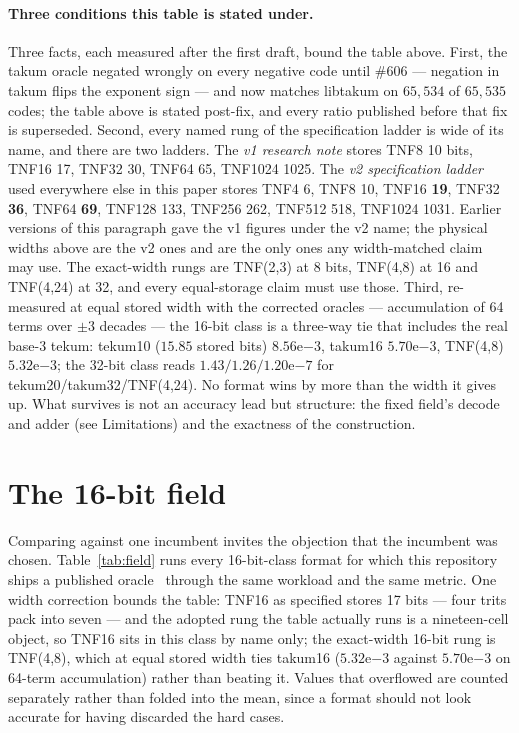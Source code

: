 \paragraph{Three conditions this table is stated under.} Three
facts, each measured after the first draft, bound the table above. First, the
takum oracle negated wrongly on every negative code until \#606 --- negation
in takum flips the exponent sign --- and now matches libtakum on $65{,}534$ of
$65{,}535$ codes; the table above is stated post-fix, and every ratio published
before that fix is superseded. Second, every named rung of the specification
ladder is wide of its name, and there are two ladders. The \emph{v1 research
note} stores TNF8 10 bits, TNF16 17, TNF32 30, TNF64 65, TNF1024 1025. The
\emph{v2 specification ladder} used everywhere else in this paper stores
TNF4 6, TNF8 10, TNF16 \textbf{19}, TNF32 \textbf{36}, TNF64 \textbf{69},
TNF128 133, TNF256 262, TNF512 518, TNF1024 1031. Earlier versions of this
paragraph gave the v1 figures under the v2 name; the physical widths above are
the v2 ones and are the only ones any width-matched claim may use. The
exact-width rungs are TNF(2,3) at 8 bits, TNF(4,8) at 16 and TNF(4,24) at 32,
and every equal-storage claim must use those. Third, re-measured at equal stored width
with the corrected oracles --- accumulation of 64 terms over $\pm3$ decades
--- the 16-bit class is a three-way tie that includes the real base-3 tekum:
tekum10 ($15.85$ stored bits) $8.56\mathrm{e}{-3}$, takum16
$5.70\mathrm{e}{-3}$, TNF(4,8) $5.32\mathrm{e}{-3}$; the 32-bit class reads
$1.43/1.26/1.20\mathrm{e}{-7}$ for tekum20/takum32/TNF(4,24). No format wins
by more than the width it gives up. What survives is not an accuracy lead but
structure: the fixed field's decode and adder (see Limitations) and the
exactness of the construction.


\section{The 16-bit field}\label{sec:field}



Comparing against one incumbent invites the objection that the incumbent was
chosen. Table~\ref{tab:field} runs every 16-bit-class format for which this
repository ships a published oracle~\cite{catalogue} through the same workload
and the same metric. One width correction bounds the table: TNF16 as specified
stores 17 bits --- four trits pack into seven --- and the adopted rung the
table actually runs is a nineteen-cell object, so TNF16 sits in this class by
name only; the exact-width 16-bit rung is TNF(4,8), which at equal stored
width ties takum16 ($5.32\mathrm{e}{-3}$ against $5.70\mathrm{e}{-3}$ on
64-term accumulation) rather than beating it. Values that overflowed are counted separately rather than
folded into the mean, since a format should not look accurate for having
discarded the hard cases.

